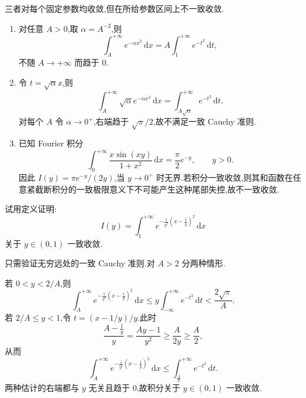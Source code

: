\begin{solution}
    三者对每个固定参数均收敛,但在所给参数区间上不一致收敛.
    \begin{enumerate}
        \item 对任意 $A>0$,取 $\alpha=A^{-2}$,则
              \[
                  \displaystyle\int_A^{+\infty}e^{-\alpha x^2}\,\mathrm{d}x
                  =A\int_1^{+\infty}e^{-t^2}\,\mathrm{d}t,
              \]
              不随 $A\to+\infty$ 而趋于 $0$.
        \item 令 $t=\sqrt\alpha x$,则
              \[
                  \displaystyle\int_A^{+\infty}\sqrt\alpha e^{-\alpha x^2}\,\mathrm{d}x
                  =\int_{A\sqrt\alpha}^{+\infty}e^{-t^2}\,\mathrm{d}t.
              \]
              对每个 $A$ 令 $\alpha\to0^+$,右端趋于 $\sqrt\pi/2$,故不满足一致 Cauchy 准则.
        \item 已知 Fourier 积分
              \[
                  \displaystyle\int_0^{+\infty}\dfrac{x\sin(xy)}{1+x^2}\,\mathrm{d}x
                  =\dfrac{\pi}{2}e^{-y},
                  \qquad y>0.
              \]
              因此 $I(y)=\pi e^{-y}/(2y)$,当 $y\to0^+$ 时无界.若积分一致收敛,则其和函数在任意紧截断积分的一致极限意义下不可能产生这种尾部失控,故不一致收敛.
    \end{enumerate}
\end{solution}

\begin{example}
    试用定义证明:
    \[
        I(y)=\int_1^{+\infty}e^{-\frac{1}{y^2}(x-\frac{1}{y})^2}\,\mathrm{d}x
    \]
    关于 $y\in(0,1)$ 一致收敛.
\end{example}
\exampleblank

\begin{solution}
    只需验证无穷远处的一致 Cauchy 准则.对 $A>2$ 分两种情形.

    若 $0<y<2/A$,则
    \[
        \displaystyle\int_A^{+\infty}e^{-\frac{1}{y^2}(x-\frac{1}{y})^2}\,\mathrm{d}x
        \leq y\int_{-\infty}^{+\infty}e^{-t^2}\,\mathrm{d}t
        <\dfrac{2\sqrt\pi}{A}.
    \]
    若 $2/A\leq y<1$,令 $t=(x-1/y)/y$.此时
    \[
        \dfrac{A-\frac{1}{y}}{y}=\dfrac{Ay-1}{y^2}\geq\dfrac{A}{2y}\geq\dfrac{A}{2},
    \]
    从而
    \[
        \displaystyle\int_A^{+\infty}e^{-\frac{1}{y^2}(x-\frac{1}{y})^2}\,\mathrm{d}x
        \leq\int_{\frac{A}{2}}^{+\infty}e^{-t^2}\,\mathrm{d}t.
    \]
    两种估计的右端都与 $y$ 无关且趋于 $0$,故积分关于 $y\in(0,1)$ 一致收敛.
\end{solution}


